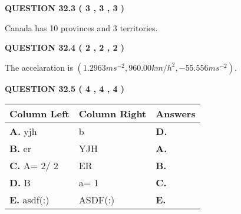\documentclass[12pt]{article}
\begin{document}
  
\vspace{0.2in}
  
{\textbf{\Large{QUESTION
32.3 
 (           3 ,           3 ,           3 )
}}}
  
  
 
 
\noindent{}
 
 
Canada has  %
10 provinces and  %
3 territories.
 
 
 
 
  
\vspace{0.2in}
  
{\textbf{\Large{QUESTION
32.4 
 (           2 ,           2 ,           2 )
}}}
  
  
 
 
\noindent{}
 
 
The accelaration is
$(
1.2963ms^{-2},
960.00km/h^2,
-55.556ms^{-2}
).
$
 
 
 
 
  
\vspace{0.2in}
  
{\textbf{\Large{QUESTION
32.5 
 (           4 ,           4 ,           4 )
}}}
  
  
 
 
\noindent{}
  
  
\begin{tabular}{|l|l|l|}
 \hline
 Column Left & Column Right  & Answers       \\ 
 \hline
{\textbf{\large{
A.}}}
yjh
  & 
b
 & 
{\textbf{\large{
D.}}}
 \\ 
 \hline
{\textbf{\large{
B.}}}
er
  & 
YJH
 & 
{\textbf{\large{
A.}}}
 \\ 
 \hline
{\textbf{\large{
C.}}}
 A= %
2/ %
2

  & 
ER
 & 
{\textbf{\large{
B.}}}
 \\ 
 \hline
{\textbf{\large{
D.}}}
B
  & 
 a= %
1
 & 
{\textbf{\large{
C.}}}
 \\ 
 \hline
{\textbf{\large{
E.}}}
asdf(:)
  & 
ASDF(:)
 & 
{\textbf{\large{
E.}}}
 \\ 
 \hline
 \end{tabular}
  
  
 
\end{document}
